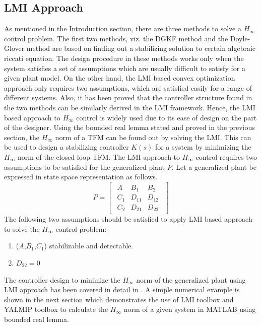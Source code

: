 \documentclass[a4paper,12pt]{article}
\begin{document}
		\subsection{LMI Approach}
		As mentioned in the Introduction section, there are three methods to solve a $H_{\infty}$ control problem. The first two methods, viz. the DGKF method and the Doyle-Glover method are based on finding out a stabilizing solution to certain algebraic riccati equation. The design procedure in these methods works only when the system satisfies a set of assumptions which are usually difficult to satisfy for a given plant model. On the other hand, the LMI based convex optimization approach only requires two assumptions, which are satisfied easily for a range of different systems. Also, it has been proved that the controller structure found in the two methods can be similarly derived in the LMI framework. Hence, the LMI based approach to $H_{\infty}$ control is widely used due to its ease of design on the part of the designer.
	Using the bounded real lemma stated and proved in the previous section, the $H_{\infty}$ norm of a TFM can be found out by solving the LMI. This can be used to design a stabilizing controller $K(s)$ for a system by minimizing the $H_{\infty}$ norm of the closed loop TFM. The LMI approach to $H_{\infty}$ control requires two assumptions to be satisfied for the generalized plant $P$. Let a generalized plant be expressed in state space representation as follows.
	\[
	P=\begin{bmatrix}
	\begin{array}{c|cc}
	A & B_{1} & B_{2}\\ \hline
	C_{1} & D_{11} & D_{12} \\ 
	C_{2} & D_{21} & D_{22}	
	\end{array}
	\end{bmatrix}
	\]
	The following two assumptions should be satisfied to apply LMI based approach to solve the $H_{\infty}$ control problem:
	\begin{enumerate}
		\item ($A$,$B_{1}$,$C_{1}$) stabilizable and detectable.
		\item $D_{22} = 0$
	\end{enumerate}
	The controller design to minimize the $H_{\infty}$ norm of the generalized plant using LMI approach has been covered in detail in \cite{Pasca}. A simple numerical example is shown in the next section which demonstrates the use of LMI toolbox and YALMIP toolbox to calculate the $H_{\infty}$ norm of a given system in MATLAB using bounded real lemma. 
\end{document}
